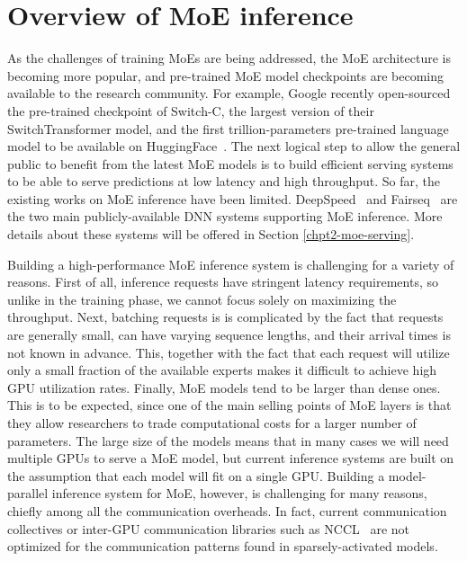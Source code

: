 \section{Overview of MoE inference}
As the challenges of training MoEs are being addressed, the MoE architecture is becoming more popular, and pre-trained MoE model checkpoints are becoming available to the research community. For example, Google recently open-sourced the pre-trained checkpoint of Switch-C, the largest version of their SwitchTransformer model, and the first trillion-parameters pre-trained language model to be available on HuggingFace~\cite{switch_huggingface}. The next logical step to allow the general public to benefit from the latest MoE models is to build efficient serving systems to be able to serve predictions at low latency and high throughput. So far, the existing works on MoE inference have been limited. DeepSpeed~\cite{deepspeed-moe} and Fairseq~\cite{fairseq} are the two main publicly-available DNN systems supporting MoE inference. More details about these systems will be offered in Section \ref{chpt2-moe-serving}.

Building a high-performance MoE inference system is challenging for a variety of reasons. First of all, inference requests have stringent latency requirements, so unlike in the training phase, we cannot focus solely on maximizing the throughput. Next, batching requests is is complicated by the fact that requests are generally small, can have varying sequence lengths, and their arrival times is not known in advance. This, together with the fact that each request will utilize only a small fraction of the available experts makes it difficult to achieve high GPU utilization rates. Finally, MoE models tend to be larger than dense ones. This is to be expected, since one of the main selling points of MoE layers is that they allow researchers to trade computational costs for a larger number of parameters. The large size of the models means that in many cases we will need multiple GPUs to serve a MoE model, but current inference systems are built on the assumption that each model will fit on a single GPU. Building a model-parallel inference system for MoE, however, is challenging for many reasons, chiefly among all the communication overheads. In fact, current communication collectives or inter-GPU communication libraries such as NCCL~\cite{nccl} are not optimized for the communication patterns found in sparsely-activated models.

